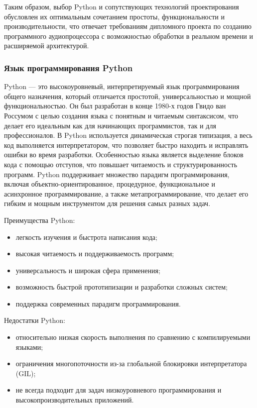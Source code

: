 Таким образом, выбор Python и сопутствующих технологий проектирования обусловлен их оптимальным сочетанием простоты, функциональности и производительности, что отвечает требованиям дипломного проекта по созданию программного аудиопроцессора с возможностью обработки в реальном времени и расширяемой архитектурой.

\subsubsection{Язык программирования Python}

Python — это высокоуровневый, интерпретируемый язык программирования общего назначения, который отличается простотой, универсальностью и мощной функциональностью. Он был разработан в конце 1980-х годов Гвидо ван Россумом с целью создания языка с понятным и читаемым синтаксисом, что делает его идеальным как для начинающих программистов, так и для профессионалов. В Python используется динамическая строгая типизация, а весь код выполняется интерпретатором, что позволяет быстро находить и исправлять ошибки во время разработки. Особенностью языка является выделение блоков кода с помощью отступов, что повышает читаемость и структурированность программ. Python поддерживает множество парадигм программирования, включая объектно-ориентированное, процедурное, функциональное и асинхронное программирование, а также метапрограммирование, что делает его гибким и мощным инструментом для решения самых разных задач.

Преимущества Python:
\begin{itemize}
	\item легкость изучения и быстрота написания кода;
	\item высокая читаемость и поддерживаемость программ;
	\item универсальность и широкая сфера применения;
	\item возможность быстрой прототипизации и разработки сложных систем;
	\item поддержка современных парадигм программирования.
\end{itemize}

Недостатки Python:
\begin{itemize}
	\item относительно низкая скорость выполнения по сравнению с компилируемыми языками;
	\item ограничения многопоточности из-за глобальной блокировки интерпретатора (GIL);
	\item не всегда подходит для задач низкоуровневого программирования и высокопроизводительных приложений.
\end{itemize}

